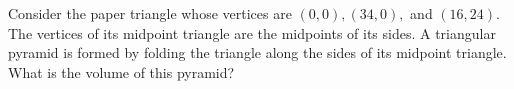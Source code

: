 Consider the paper triangle whose vertices are $(0,0), (34,0),$ and $(16,24).$  The vertices of its midpoint triangle are the midpoints of its sides.  A triangular pyramid is formed by folding the triangle along the sides of its midpoint triangle.  What is the volume of this pyramid?